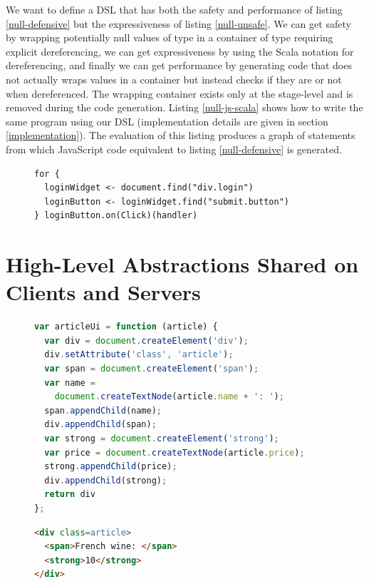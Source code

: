 \documentclass[preprint]{sigplanconf}
\begin{document}
We want to define a DSL that has both the safety and performance of listing \ref{null-defensive} but the
expressiveness of listing \ref{null-unsafe}. We can get safety by wrapping potentially null values of type
 in a container of type  requiring explicit dereferencing, we can get
expressiveness by using the Scala  notation for dereferencing, and finally we can get performance by
generating code that does not actually wraps values in a container but instead checks if they are  or not
when dereferenced. The wrapping container exists only at the stage-level and is removed during the code generation.
Listing \ref{null-js-scala} shows how to write the same program using our DSL (implementation details are
given in section \ref{implementation}). The evaluation of this listing produces a graph of statements from which
JavaScript code equivalent to listing \ref{null-defensive} is generated.

\begin{figure}
\begin{lstlisting}[label=null-js-scala,caption=Handling null references in js-scala]
for {
  loginWidget <- document.find("div.login")
  loginButton <- loginWidget.find("submit.button")
} loginButton.on(Click)(handler)
\end{lstlisting}
\end{figure}


\section{High-Level Abstractions Shared on Clients and Servers}
\label{contribution-shared}

\begin{figure}
\begin{lstlisting}[language=JavaScript,caption=JavaScript DOM API,label=dom-api]
var articleUi = function (article) {
  var div = document.createElement('div');
  div.setAttribute('class', 'article');
  var span = document.createElement('span');
  var name =
    document.createTextNode(article.name + ': ');
  span.appendChild(name);
  div.appendChild(span);
  var strong = document.createElement('strong');
  var price = document.createTextNode(article.price);
  strong.appendChild(price);
  div.appendChild(strong);
  return div
};
\end{lstlisting}
\end{figure}

\begin{figure}
\begin{lstlisting}[language=HTML,caption=HTML,label=html]
<div class=article>
  <span>French wine: </span>
  <strong>10</strong>
</div>
\end{lstlisting}
\end{figure}
\end{document}
